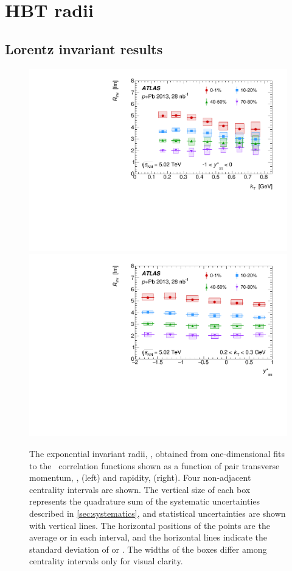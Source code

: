 \FloatBarrier
\section{HBT radii}
\subsection{Lorentz invariant results}
\label{subsec:invariant_results}

\begin{figure}[t]
\centering
\includegraphics[width=0.49\linewidth]{canqinv_R_vs_kt.pdf}
\includegraphics[width=0.49\linewidth]{canqinv_R_vs_kys.pdf}
\caption{The exponential invariant radii, \Rinv, obtained from one-dimensional fits to
the \qinv\ correlation functions shown as a function of pair transverse momentum, \kt, (left) and rapidity, \kys (right). Four non-adjacent centrality intervals are shown. The vertical size of each box represents the quadrature sum of the systematic uncertainties described in \cref{sec:systematics}, and statistical uncertainties are shown with vertical lines. The horizontal positions of the points are the average \kt or \kys in each interval, and the horizontal lines indicate the standard deviation of \kt or \kys. The widths of the boxes differ among centrality intervals only for visual clarity.}
\label{fig:results_Rinv_kt}
\end{figure}
